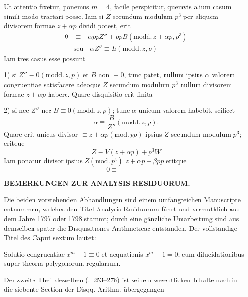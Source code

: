 Ut attentio fixetur, ponemus $m=4$, facile perspicitur, quemvis alium casum simili modo tractari posse. Iam si $Z$ secundum modulum $p^3$ per aliquem divisorem formae $z+\alpha p$ dividi potest, erit
\[
\begin{aligned}
0&\equiv-\alpha ppZ''+ppB(\mathrm{modd.}\,z+\alpha p,p^3)\\
&\text{seu}\quad\alpha Z''\equiv B(\mathrm{modd.}\,z,p)
\end{aligned}
\]
Iam tres casus esse possunt

1) si $Z''\equiv0(\mathrm{modd.}\,z,p)$ et $B$ non $\equiv0$, tunc patet, nullum ipsius $\alpha$ valorem congruentiae satisfacere adeoque $Z$ secundum modulum $p^3$ nullum divisorem formae $z+\alpha p$ habere. Quare disquisitio erit finita

%
2) si nec $Z''$ nec $B\equiv0(\mathrm{modd.}\,z,p)$; tunc $\alpha$ unicum valorem habebit, scilicet
\[
\alpha\equiv\frac B{Z''}(\mathrm{modd.}\,z,p).
\]
Quare erit unicus divisor $\equiv z+\alpha p(\mathrm{mod.}\,pp)$ ipsius $Z$ secundum modulum $p^3$; eritque
\[
Z\equiv V(z+\alpha p)+p^3W
\]
Iam ponatur divisor ipsius $Z(\mathrm{mod.}\,p^4)$ $z+\alpha p+\beta pp$ eritque
\[
0\equiv\qquad\qquad
\]

\par\bigskip{}
\begin{center}\large\bfseries BEMERKUNGEN ZUR ANALYSIS RESIDUORUM.\end{center}
\renewcommand{\BookRunningTitle}{Nachlass. Bemerkungen zur Analysis residuorum}

Die beiden vorstehenden Abhandlungen sind einem umfangreichen Manu\-scripte entnommen, welches den Titel Analysis Residuorum führt und vermuthlich aus dem Jahre 1797 oder 1798 stammt; durch eine gänzliche Umarbeitung sind aus demselben später die Disquisitiones Arithmeticae entstanden. Der vollständige Titel des Caput sextum lautet:

Solutio congruentiae $x^m-1\equiv0$ et aequationis $x^m-1=0$; cum dilucidationibus super theoria polygonorum regularium.

Der zweite Theil desselben (\textsection\textsection.\ 253--278) ist seinem wesentlichen Inhalte nach in die siebente Section der Disqq. Arithm. übergegangen.

